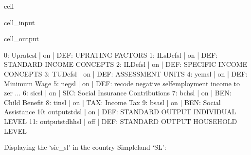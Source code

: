 \documentclass[letterpaper,10pt,english]{sphinxmanual}
\begin{document}
\begin{sphinxuseclass}{cell}
\begin{sphinxuseclass}{cell_input}
\begin{sphinxVerbatim}[commandchars=\\\{\}]
\PYG{p}{[}\PYG{p}{]}\PYG{p}{[}\PYG{p}{]}
\end{sphinxVerbatim}

\end{sphinxuseclass}
\begin{sphinxuseclass}{cell_output}
\begin{sphinxVerbatim}[commandchars=\\\{\}]
0: Uprate\PYGZus{}sl             | on        |    DEF: UPRATING FACTORS 
1: ILsDef\PYGZus{}sl             | on        |    DEF: STANDARD INCOME CONCEPTS 
2: ILDef\PYGZus{}sl              | on        |    DEF: SPECIFIC INCOME CONCEPTS 
3: TUDef\PYGZus{}sl              | on        |    DEF: ASSESSMENT UNITS 
4: yem\PYGZus{}sl                | on        |    DEF: Minimum Wage 
5: neg\PYGZus{}sl                | on        |    DEF: recode negative self\PYGZhy{}employment income to zer ... 
6: sic\PYGZus{}sl                | on        |    SIC: Social Insurance Contributions 
7: bch\PYGZus{}sl                | on        |    BEN: Child Benefit 
8: tin\PYGZus{}sl                | on        |    TAX: Income Tax 
9: bsa\PYGZus{}sl                | on        |    BEN: Social Assistance 
10: output\PYGZus{}std\PYGZus{}sl        | on        |    DEF: STANDARD OUTPUT INDIVIDUAL LEVEL 
11: output\PYGZus{}std\PYGZus{}hh\PYGZus{}sl     | off       |    DEF: STANDARD OUTPUT HOUSEHOLD LEVEL 
\end{sphinxVerbatim}

\end{sphinxuseclass}
\end{sphinxuseclass}
\sphinxAtStartPar
Displaying the  ‘sic\_sl’ in the country Simpleland ‘SL’:
\end{document}
